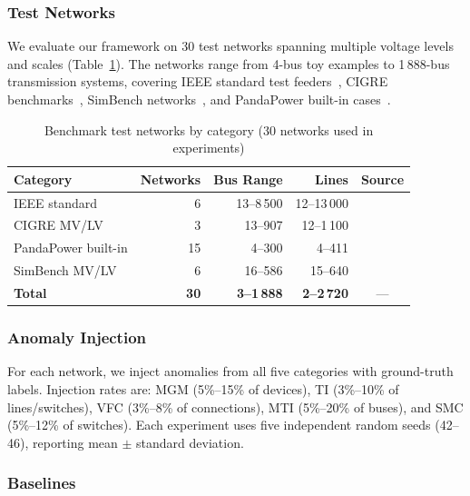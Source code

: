 \documentclass[research]{fcs}
\begin{document}
\subsubsection{Test Networks}

We evaluate our framework on 30 test networks spanning multiple voltage levels and scales (Table~\ref{tab:networks}). The networks range from 4-bus toy examples to 1\,888-bus transmission systems, covering IEEE standard test feeders~\cite{ieee13bus1991}, CIGRE benchmarks~\cite{cigre_mv2014}, SimBench networks~\cite{simbench2020}, and PandaPower built-in cases~\cite{pandapower2018}.

\begin{table}[htbp]
\centering
\caption{Benchmark test networks by category (30 networks used in experiments)}
\label{tab:networks}
\begin{tabular}{@{}lrrrc@{}}
\toprule
Category & Networks & Bus Range & Lines & Source \\
\midrule
IEEE standard & 6 & 13--8\,500 & 12--13\,000 & \cite{ieee13bus1991,ieee_8500_node} \\
CIGRE MV/LV & 3 & 13--907 & 12--1\,100 & \cite{cigre_mv2014} \\
PandaPower built-in & 15 & 4--300 & 4--411 & \cite{pandapower2018} \\
SimBench MV/LV & 6 & 16--586 & 15--640 & \cite{simbench2020} \\
\midrule
\textbf{Total} & \textbf{30} & \textbf{3--1\,888} & \textbf{2--2\,720} & --- \\
\bottomrule
\end{tabular}
\end{table}

\subsubsection{Anomaly Injection}

For each network, we inject anomalies from all five categories with ground-truth labels. Injection rates are: MGM (5\%--15\% of devices), TI (3\%--10\% of lines/switches), VFC (3\%--8\% of connections), MTI (5\%--20\% of buses), and SMC (5\%--12\% of switches). Each experiment uses five independent random seeds (42--46), reporting mean $\pm$ standard deviation.

\subsubsection{Baselines}
\end{document}
